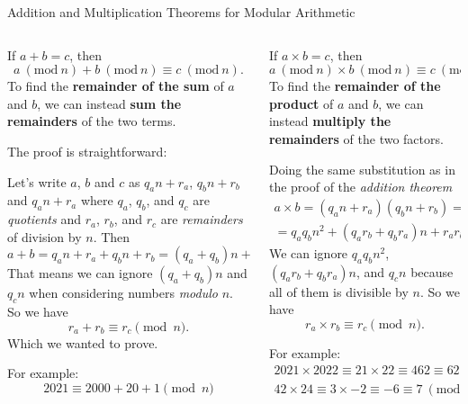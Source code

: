 \documentclass[9pt,aspectratio=169]{beamer}
\newcommand{\Mod}[1]{\ (\mathrm{mod}\ #1)}
\begin{document}
\begin{frame}{Addition and Multiplication Theorems for Modular Arithmetic}  
  \begin{columns}[T]
    \begin{column}{0.5\textwidth}
      \begin{theorem}
        If $a + b = c$, then 
        \[a\Mod{n} + b\Mod{n} \equiv c\Mod{n}.\]
        To find the \textbf{remainder of the sum} of $a$ and $b$, we can instead \textbf{sum the remainders} of the two terms.  
      \end{theorem}
       
      The proof is straightforward:

      Let's write $a$, $b$ and $c$ as $q_a n + r_a$, $q_b n + r_b$ and $q_a n + r_a$ where $q_a$, $q_b$, and $q_c$ are \emph{quotients} and $r_a$, $r_b$, and $r_c$ are \emph{remainders} of division by $n$.
      Then
      \[ a + b = q_a n + r_a + q_b n + r_b = (q_a + q_b) n + (r_a + r_b) \]
      That means we can ignore $(q_a + q_b) n$ and $q_c n$ when considering numbers \emph{modulo} $n$. So we have 
      \[ r_a + r_b \equiv r_c \pmod{n}. \]
      Which we wanted to prove.
      \begin{example}
        For example:
        \[ 2021 \equiv 2000 + 20 + 1 \pmod{n} \]
        \vspace*{-2.5ex}
      \end{example}
    \end{column}
    \begin{column}{0.5\textwidth}
      \begin{theorem}
        If $a \times b = c$, then 
        \[a\Mod{n} \times b\Mod{n} \equiv c\Mod{n}.\]
        To find the \textbf{remainder of the product} of $a$ and $b$, we can instead \textbf{multiply the remainders} of the two factors.
      \end{theorem}
      Doing the same substitution as in the proof of the \emph{addition theorem}
      \begin{multline*}
        a \times b = (q_a n + r_a) (q_b n + r_b) = \\ = q_a q_b n^2 + (q_a r_b + q_b r_a) n + r_a r_b.
      \end{multline*}
      We can ignore $q_a q_b n^2$, $(q_a r_b + q_b r_a) n$, and $q_c n$ because all of them is divisible by $n$. So we have
      \[ r_a \times r_b \equiv r_c \pmod{n}. \]\vspace*{-1ex}
      \begin{example}
        For example:
        \begin{gather*}
          2021 \times 2022 \equiv 21 \times 22 \equiv 462 \equiv 62 \Mod{100}; \\
          42 \times 24 \equiv 3 \times −2 \equiv −6 \equiv 7 \Mod{13}.
        \end{gather*}
        \vspace*{-2.2ex}
      \end{example}
    \end{column}
  \end{columns}
\end{frame}
\end{document}
